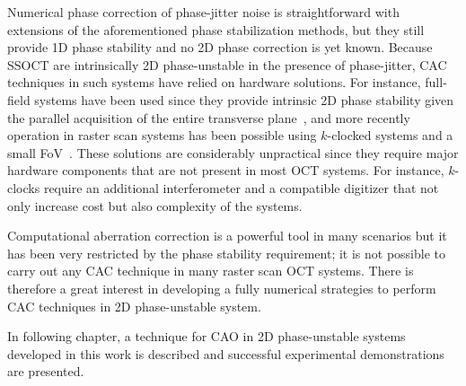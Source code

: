 Numerical phase correction of phase-jitter noise is straightforward with extensions of the aforementioned phase stabilization methods, but they still provide 1D phase stability and no 2D phase correction is yet known. Because SSOCT are intrinsically 2D phase-unstable in the presence of phase-jitter, CAC techniques in such systems have relied on hardware solutions. For instance, full-field systems have been used since they provide intrinsic 2D phase stability given the parallel acquisition of the entire transverse plane~\cite{Kumar2013_Subaperture, Hillmann2016_Aberrationfree}, and more recently operation in raster scan systems has been possible using $k$-clocked systems and a small FoV~\cite{Kumar2017_Invivo}. These solutions are considerably unpractical since they require major hardware components that are not present in most OCT systems. For instance, $k$-clocks require an additional interferometer and a compatible digitizer that not only increase cost but also complexity of the systems.

Computational aberration correction is a powerful tool in many scenarios but it has been very restricted by the phase stability requirement; it is not possible to carry out any CAC technique in many raster scan OCT systems. There is therefore a great interest in developing a fully numerical strategies to perform CAC techniques in 2D phase-unstable system.

In following chapter, a technique for CAO in 2D phase-unstable systems developed in this work is described and successful experimental demonstrations are presented.